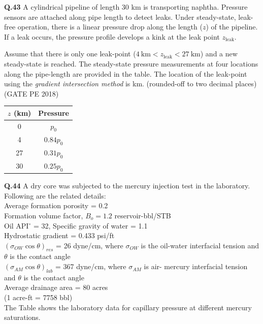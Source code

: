 \documentclass[12pt,a4paper]{article}
\begin{document}
\noindent\textbf{Q.43} A cylindrical pipeline of length 30 km is transporting naphtha. Pressure sensors are attached along pipe length to detect leaks. Under steady-state, leak-free operation, there is a linear pressure drop along the length ($z$) of the pipeline. If a leak occurs, the pressure profile develops a kink at the leak point $z_{\text{leak}}$.

\vspace{0.2cm}
Assume that there is only one leak-point ($4~\text{km} < z_{\text{leak}} < 27~\text{km}$) and a new steady-state is reached. The steady-state pressure measurements at four locations along the pipe-length are provided in the table. The location of the leak-point using the \textit{gradient intersection method} is \underline{\hspace{2cm}} km. (rounded-off to two decimal places) \hfill (GATE PE 2018)

\vspace{0.3cm}
\begin{tabular}{|c|c|}
\hline
$z$ (km) & Pressure \\
\hline
0 & $p_0$ \\
4 & $0.84p_0$ \\
27 & $0.31p_0$ \\
30 & $0.25p_0$ \\
\hline
\end{tabular}
\pagebreak

\noindent\textbf{Q.44} A dry core was subjected to the mercury injection test in the laboratory. Following are the related details: \\ 
Average formation porosity = 0.2 \\ 
Formation volume factor, $B_o = 1.2$ reservoir-bbl/STB \\ 
Oil API$^\circ$ = 32, Specific gravity of water = 1.1 \\ 
Hydrostatic gradient = 0.433 psi/ft \\ 
$(\sigma_{OW} \cos \theta)_{res}$ = 26 dyne/cm, where $\sigma_{OW}$ is the oil-water interfacial tension and $\theta$ is the contact angle \\ 
$(\sigma_{AM} \cos \theta)_{lab}$ = 367 dyne/cm, where $\sigma_{AM}$ is air- mercury interfacial tension and $\theta$ is the contact angle \\ 
Average drainage area = 80 acres \\ 
(1 acre-ft = 7758 bbl) \\ 

The Table shows the laboratory data for capillary pressure at different mercury saturations.
\end{document}
